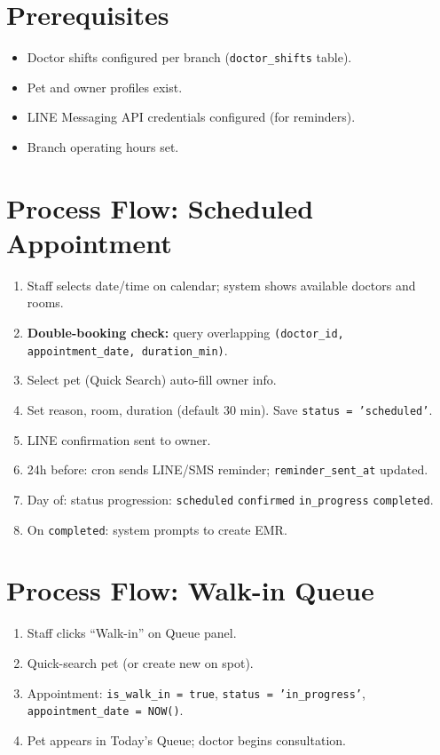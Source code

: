 \documentclass[12pt,a4paper]{report}
\begin{document}
\section{Prerequisites}

\begin{itemize}
  \item Doctor shifts configured per branch (\texttt{doctor\_shifts} table).
  \item Pet and owner profiles exist.
  \item LINE Messaging API credentials configured (for reminders).
  \item Branch operating hours set.
\end{itemize}

\section{Process Flow: Scheduled Appointment}

\begin{enumerate}
  \item Staff selects date/time on calendar; system shows available doctors and rooms.
  \item \textbf{Double-booking check:} query overlapping \texttt{(doctor\_id, appointment\_date, duration\_min)}.
  \item Select pet (Quick Search) \textrightarrow{} auto-fill owner info.
  \item Set reason, room, duration (default 30 min). Save \textrightarrow{} \texttt{status = 'scheduled'}.
  \item LINE confirmation sent to owner.
  \item 24h before: cron sends LINE/SMS reminder; \texttt{reminder\_sent\_at} updated.
  \item Day of: status progression: \texttt{scheduled} \textrightarrow{} \texttt{confirmed} \textrightarrow{} \texttt{in\_progress} \textrightarrow{} \texttt{completed}.
  \item On \texttt{completed}: system prompts to create EMR.
\end{enumerate}

\section{Process Flow: Walk-in Queue}

\begin{enumerate}
  \item Staff clicks ``Walk-in'' on Queue panel.
  \item Quick-search pet (or create new on spot).
  \item Appointment: \texttt{is\_walk\_in = true}, \texttt{status = 'in\_progress'}, \texttt{appointment\_date = NOW()}.
  \item Pet appears in Today's Queue; doctor begins consultation.
\end{enumerate}
\end{document}
